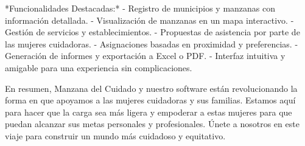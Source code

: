 *Funcionalidades Destacadas:*
- Registro de municipios y manzanas con información detallada.
- Visualización de manzanas en un mapa interactivo.
- Gestión de servicios y establecimientos.
- Propuestas de asistencia por parte de las mujeres cuidadoras.
- Asignaciones basadas en proximidad y preferencias.
- Generación de informes y exportación a Excel o PDF.
- Interfaz intuitiva y amigable para una experiencia sin complicaciones.

En resumen, Manzana del Cuidado y nuestro software están revolucionando la forma en que apoyamos a las mujeres cuidadoras y sus familias. Estamos aquí para hacer que la carga sea más ligera y empoderar a estas mujeres para que puedan alcanzar sus metas personales y profesionales. Únete a nosotros en este viaje para construir un mundo más cuidadoso y equitativo.